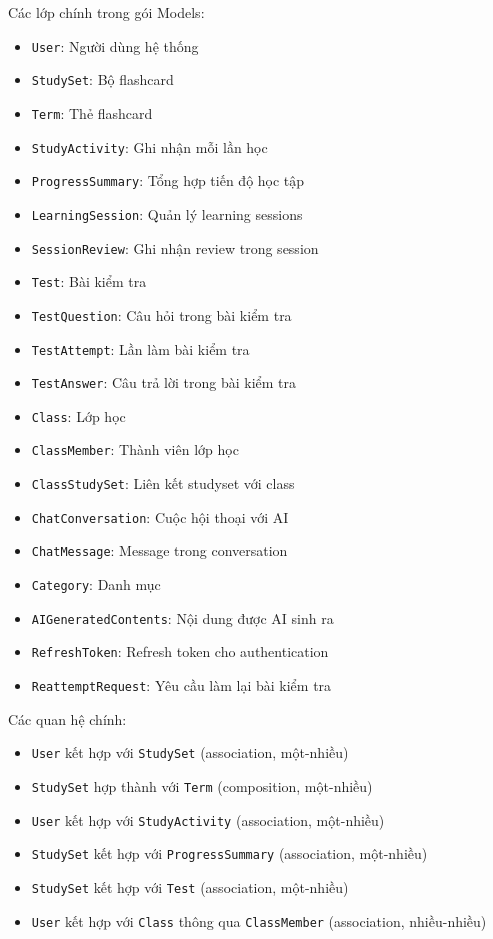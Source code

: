 \documentclass[../DoAn.tex]{subfiles}
\begin{document}
Các lớp chính trong gói Models:
\begin{itemize}
    \item \texttt{User}: Người dùng hệ thống
    \item \texttt{StudySet}: Bộ flashcard
    \item \texttt{Term}: Thẻ flashcard
    \item \texttt{StudyActivity}: Ghi nhận mỗi lần học
    \item \texttt{ProgressSummary}: Tổng hợp tiến độ học tập
    \item \texttt{LearningSession}: Quản lý learning sessions
    \item \texttt{SessionReview}: Ghi nhận review trong session
    \item \texttt{Test}: Bài kiểm tra
    \item \texttt{TestQuestion}: Câu hỏi trong bài kiểm tra
    \item \texttt{TestAttempt}: Lần làm bài kiểm tra
    \item \texttt{TestAnswer}: Câu trả lời trong bài kiểm tra
    \item \texttt{Class}: Lớp học
    \item \texttt{ClassMember}: Thành viên lớp học
    \item \texttt{ClassStudySet}: Liên kết studyset với class
    \item \texttt{ChatConversation}: Cuộc hội thoại với AI
    \item \texttt{ChatMessage}: Message trong conversation
    \item \texttt{Category}: Danh mục
    \item \texttt{AIGeneratedContents}: Nội dung được AI sinh ra
    \item \texttt{RefreshToken}: Refresh token cho authentication
    \item \texttt{ReattemptRequest}: Yêu cầu làm lại bài kiểm tra
\end{itemize}

Các quan hệ chính:
\begin{itemize}
    \item \texttt{User} kết hợp với \texttt{StudySet} (association, một-nhiều)
    \item \texttt{StudySet} hợp thành với \texttt{Term} (composition, một-nhiều)
    \item \texttt{User} kết hợp với \texttt{StudyActivity} (association, một-nhiều)
    \item \texttt{StudySet} kết hợp với \texttt{ProgressSummary} (association, một-nhiều)
    \item \texttt{StudySet} kết hợp với \texttt{Test} (association, một-nhiều)
    \item \texttt{User} kết hợp với \texttt{Class} thông qua \texttt{ClassMember} (association, nhiều-nhiều)
\end{itemize}
\end{document}
